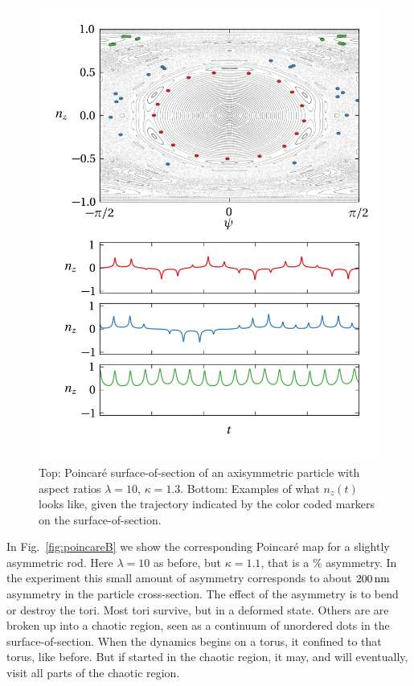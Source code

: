 \documentclass[thesis.tex]{subfiles}
\begin{document}
\begin{figure}
\includegraphics[width=12cm]{figs/poincareC.png}%
\caption{\label{fig:poincareC} Top: Poincar\'e surface-of-section of an axisymmetric particle with aspect ratios $\lambda=10$, $\kappa=1.3$. Bottom: Examples of what $n_z(t)$ looks like, given the trajectory indicated by the color coded markers on the surface-of-section. }%
\end{figure}

In Fig.~\ref{fig:poincareB} we show the corresponding Poincar\'e map for a slightly asymmetric rod. Here $\lambda=10$ as before, but $\kappa = 1.1$, that is a \unit[10]{\%} asymmetry. In the experiment this small amount of asymmetry corresponds to about $\unit[200]{nm}$ asymmetry in the particle cross-section. The effect of the asymmetry is to bend or destroy the tori. Most tori survive, but in a deformed state. Others are are broken up into a chaotic region, seen as a continuum of unordered dots in the surface-of-section. When the dynamics begins on a torus, it confined to that torus, like before. But if started in the chaotic region, it may, and will eventually, visit all parts of the chaotic region.
\end{document}
